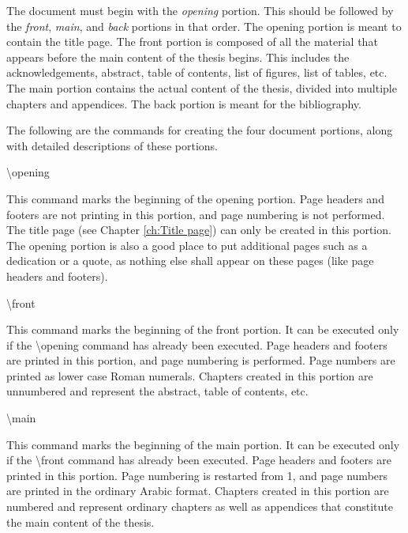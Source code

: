 \documentclass[twoside,openany]{thesis}
\begin{document}
The document must begin with the {\itshape opening} portion.
This should be followed by the {\itshape front}, {\itshape main}, and {\itshape back} portions in that order.
The opening portion is meant to contain the title page.
The front portion is composed of all the material that appears before the main content of the thesis begins.
This includes the acknowledgements, abstract, table of contents, list of figures, list of tables, etc.
The main portion contains the actual content of the thesis, divided into multiple chapters and appendices.
The back portion is meant for the bibliography.

The following are the commands for creating the four document portions, along with detailed descriptions of these portions.

\begin{listing}

\item   {\ttfamily\textbackslash opening}

        This command marks the beginning of the opening portion.
        Page headers and footers are not printing in this portion, and page numbering is not performed.
        The title page (see Chapter \ref{ch:Title page}) can only be created in this portion.
        The opening portion is also a good place to put additional pages such as a dedication or a quote, as nothing else shall appear on these pages (like page headers and footers).

\item   {\ttfamily\textbackslash front}

        This command marks the beginning of the front portion.
        It can be executed only if the {\ttfamily\textbackslash opening} command has already been executed.
        Page headers and footers are printed in this portion, and page numbering is performed.
        Page numbers are printed as lower case Roman numerals.
        Chapters created in this portion are unnumbered and represent the abstract, table of contents, etc.

\item   {\ttfamily\textbackslash main}

        This command marks the beginning of the main portion.
        It can be executed only if the {\ttfamily\textbackslash front} command has already been executed.
        Page headers and footers are printed in this portion.
        Page numbering is restarted from 1, and page numbers are printed in the ordinary Arabic format.
        Chapters created in this portion are numbered and represent ordinary chapters as well as appendices that constitute the main content of the thesis.


\end{listing}
\end{document}
